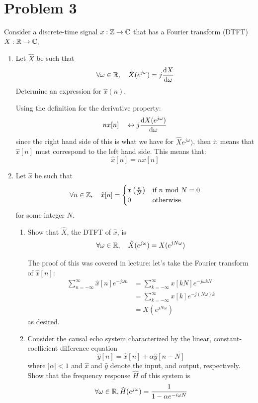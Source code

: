 \documentclass[10pt]{article}
\begin{document}
	\section*{Problem 3} 
	Consider a discrete-time signal \( x: \mathbb Z \to \mathbb C \) that has a Fourier transform (DTFT) \( X: \mathbb R \to \mathbb C \). 
	\begin{enumerate}[label=\alph*)]
		\item Let \( \hat X\) be such that 
			\[
				\forall \omega \in \mathbb R, \quad \hat{X}(e^{j \omega}) = j\dv{X}{\omega}(e^{j \omega})
			\]
			Determine an expression for \( \hat{x}(n) \). 

			\begin{solution}
				Using the definition for the derivative property:
				\[
					nx[n] \quad \leftrightarrow j \dv{X(e^{j \omega})}{\omega} 
				\] 
				since the right hand side of this is what we have for \( \hat{X}e^{j \omega}) \), then it means 
				that \( \hat{x}[n] \) must correspond to the left hand side. This means that:
				\[
					\hat{x}[n] = nx[n]
				\] 
			\end{solution}
		\item Let \( \hat{x} \) be such that 
			\[
				\forall n \in \mathbb Z, \quad \hat{x}[n] = \begin{cases}
					x\left( \frac{n}{N} \right)  & \text{if \( n \) mod \( N = 0\)}\\
					0 & \text{otherwise}
				\end{cases}
			\] 
			for some integer \( N \).
			\begin{enumerate}[label=\roman*)]
				\item Show that \( \hat{X} \), the DTFT of \( \hat{x} \), is
					\[
					\forall \omega \in \mathbb R, \quad \hat{X}(e^{j \omega}) = X(e^{j N \omega})
					\] 

					\begin{solution}
						The proof of this was covered in lecture: let's take the Fourier transform of 
						\( \hat{x}[n] \):
						\begin{align*}
							\sum_{n=-\infty}^{\infty} \hat{x}[n]e^{- j \omega n } &= \sum_{k=-\infty}^{\infty} x[kN]
							e^{-j \omega kN}\\
							&= \sum_{k=-\infty}^{\infty} x[k]e^{-j (N\omega) k}\\
							&= X(e^{j N \omega}) 
						\end{align*}	
						as desired. 
					\end{solution}
				\item Consider the causal echo system characterized by the linear, constant-coefficient difference
					equation
					\[
						\hat{y}[n] = \hat{x}[n] + \alpha \hat{y}[n - N]
					\] 
					where \( |\alpha| < 1 \) and \( \hat{x} \) and \( \hat{y} \) denote the input, and output, 
					respectively. Show that the frequency response \( \hat{H} \) of this system is 
					\[
						\forall \omega \in \mathbb R, \hat{H}(e^{ j \omega}) = \frac{1}{1 - \alpha e^{-i \omega N}}
					\] 


\end{enumerate}
\end{enumerate}
\end{document}
